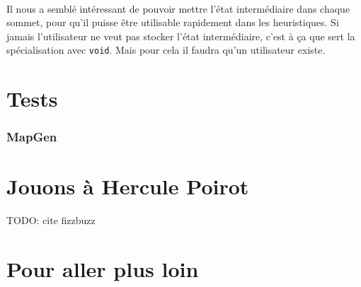 \documentclass[french]{article}
\begin{document}
\paragraph{} Il nous a semblé intéressant de pouvoir mettre l'état
intermédiaire dans chaque sommet, pour qu'il puisse être utilisable rapidement
dans les heuristiques. Si jamais l'utilisateur ne veut pas stocker l'état
intermédiaire, c'est à ça que sert la spécialisation avec
\texttt{void}. Mais pour cela il faudra qu'un utilisateur existe.

\part{Tests}

\section{MapGen}

\part{Jouons à Hercule Poirot}

{\Huge TODO: cite fizzbuzz}

\part{Pour aller plus loin}

\printbibliography%
\end{document}
